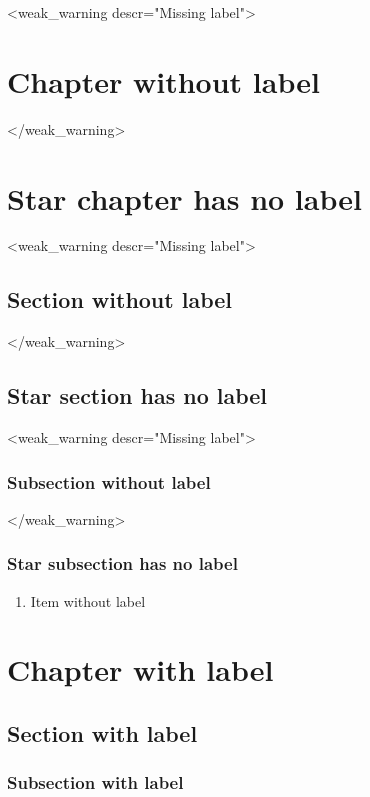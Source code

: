 \documentclass{article}
\begin{document}
    <weak_warning descr="Missing label">\chapter{Chapter without label}</weak_warning>
    \chapter*{Star chapter has no label}
    <weak_warning descr="Missing label">\section{Section without label}</weak_warning>
    \section*{Star section has no label}
    <weak_warning descr="Missing label">\subsection{Subsection without label}</weak_warning>
    \subsection*{Star subsection has no label}
    \begin{enumerate}
        \item Item without label
    \end{enumerate}
    \chapter{Chapter with label}
    \label{ch:chapter-label}
    \section{Section with label}
    \label{sec:section-label}
    \subsection{Subsection with label}
    \label{subsec:subsection-label}
\end{document}
